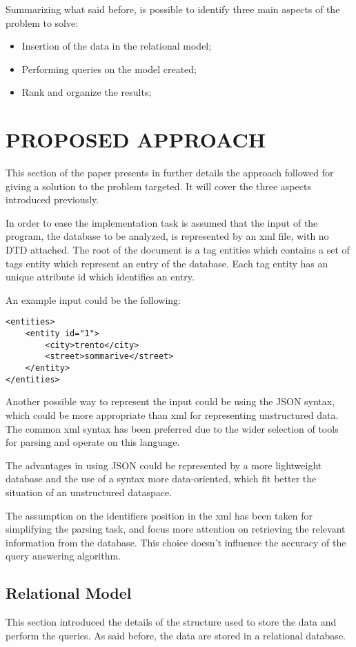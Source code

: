 \documentclass{acm_proc_article-sp-sigmod07}
\begin{document}
Summarizing what said before, is possible to identify three main aspects
of the problem to solve:
\begin{itemize}
\item Insertion of the data in the relational model;
\item Performing queries on the model created;
\item Rank and organize the results;
\end{itemize}

\section{PROPOSED APPROACH}
This section of the paper presents in further details the approach
followed for giving a solution to the problem targeted. It will cover the
three aspects introduced previously.

In order to ease the implementation task is assumed that the input of the
program, the database to be analyzed, is represented by an xml file, with
no DTD attached. The root of the document is a tag entities which
contains a set of tags entity which represent an entry of the database.
Each tag entity has an unique attribute id which identifies an entry.

An example input could be the following:

\begin{verbatim}
<entities>
    <entity id="1">
        <city>trento</city>
        <street>sommarive</street>
    </entity>
</entities>
\end{verbatim}

Another possible way to represent the input could be using the JSON
syntax, which could be more appropriate than xml for representing
unstructured data. The common xml syntax has been preferred due to the
wider selection of tools for parsing and operate on this language.

The advantages in using JSON could be represented by a more lightweight
database and the use of a syntax more data-oriented, which fit better the
situation of an unstructured dataspace.

The assumption on the identifiers position in the xml has been taken for
simplifying the parsing task, and focus more attention on retrieving the
relevant information from the database. This choice doesn't influence the
accuracy of the query answering algorithm.

\subsection{Relational Model}
This section introduced the details of the structure used to store the
data and perform the queries. As said before, the data are stored in a
relational database. 
\end{document}
